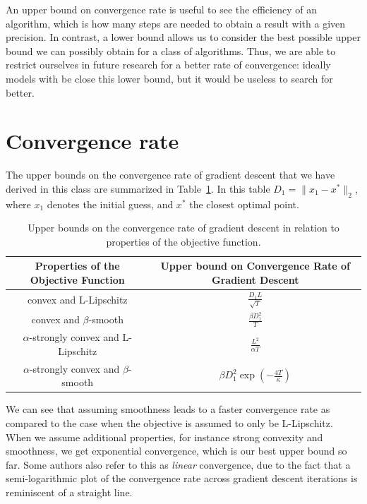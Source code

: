 \documentclass{article}
\begin{document}
An upper bound on convergence rate is useful to see the efficiency of an algorithm, which is how many steps are needed to obtain a result with a given precision. In contrast, a lower bound allows us to consider the best possible upper bound we can possibly obtain for a class of algorithms. Thus, we are able to restrict ourselves in future research for a better rate of convergence: ideally models with be close this lower bound, but it would be useless to search for better.

\section{Convergence rate}

\par The upper bounds on the convergence rate of gradient descent that we have derived in this class are summarized in Table~\ref{tab:upper_bounds}. In this table $D_1 = \|x_1-x^*\|_2$, where $x_1$ denotes the initial guess, and $x^*$ the closest optimal point.

\begin{table}[H]
\centering
\renewcommand{\arraystretch}{1.8}
 \begin{tabular}{|c | c |} 
 \hline
 \textbf{Properties of the Objective Function} & \textbf{Upper bound on Convergence Rate of Gradient Descent} \\
 \hline
 convex and L-Lipschitz & $\frac{D_1L}{\sqrt{T}}$   \\ 
 \hline
 convex and $\beta$-smooth &  $\frac{\beta D_1^2}{T}$\\
 \hline
 $\alpha$-strongly convex and L-Lipschitz & $\frac{L^2}{\alpha T}$ \\
 \hline
 $\alpha$-strongly convex and $\beta$-smooth & $\beta D_1^2 \exp(-\frac{4T}{\kappa})$ \\
 \hline
\end{tabular}
\caption{Upper bounds on the convergence rate of gradient descent in relation to properties of the objective function.\label{tab:upper_bounds}}
\end{table}
\renewcommand{\arraystretch}{1}

We can see that assuming smoothness leads to a faster convergence rate as compared to the case when the objective is assumed to only be L-Lipschitz. When we assume additional properties, for instance strong convexity and smoothness, we get exponential convergence, which is our best upper bound so far. Some authors also refer to this as \emph{linear} convergence, due to the fact that a semi-logarithmic plot of the convergence rate across gradient descent iterations is reminiscent of a straight line. \\
\end{document}
